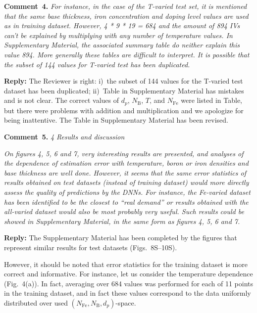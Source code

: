 \documentclass[num-refs]{wiley-article} %
\begin{document}
\vspace{1cm}
\noindent
\textcolor[rgb]{0.00,0.50,1.00}{\textbf{Comment~4.}}
\emph{
For instance, in the case of the T-varied test set, it is mentioned that the same base thickness,
iron concentration and doping level values are used as in training dataset.
However, 4 * 9 * 19 = 684 and the amount of 894 IVs can’t be explained by multiplying with any number of temperature values.
In Supplementary Material, the associated summary table do neither explain this value 894. More generally these tables are difficult to interpret. It is possible that the subset of 144 values for T-varied test has been duplicated. }

\vspace{0.5cm}
\noindent
\textcolor[rgb]{0.51,0.00,0.00}{\textbf{Reply:}}
The Reviewer is  right:
i)~the subset of 144 values for the T-varied test dataset has been duplicated;
ii)~Table in Supplementary Material has mistakes and is not clear.
The correct values of $d_p$, $N_\mathrm{B}$, $T$, and $N_{\mathrm{Fe}}$ were listed in Table,
but there were problems with addition and multiplication
and we apologize for being inattentive.
The Table in Supplementary Material has been revised.


\vspace{1cm}
\noindent
\textcolor[rgb]{0.00,0.50,1.00}{\textbf{Comment~5.}}
\emph{4 Results and discussion}

\emph{
On figures 4, 5, 6 and 7, very interesting results are presented,
and analyses of the dependence of estimation
error with temperature, boron or iron densities and base thickness are well done.
However, it seems that the same error statistics of results obtained on test datasets
(instead of training dataset) would more directly assess the quality of predictions by the DNNs.
For instance, the Fe-varied dataset has been identified to be
the closest to “real demand” or results obtained with the all-varied dataset
would also be most probably very useful.
Such results could be showed in Supplementary Material, in the same form as figures 4, 5, 6 and 7. }

\vspace{0.5cm}
\noindent
\textcolor[rgb]{0.51,0.00,0.00}{\textbf{Reply:}}
The Supplementary Material has been completed by the figures
that  represent similar results for test datasets (Figs.~8S--10S).


However, it should be noted that error statistics for the training dataset is more correct and informative. 
For instance, let us consider the temperature dependence (Fig.~4(a)). 
In fact, averaging over 684 values was performed for each of 11 points in the training dataset, 
and in fact these values correspond to the data uniformly distributed over used $(N_\mathrm{Fe},N_\mathrm{B},d_p)$-space.
\end{document}
